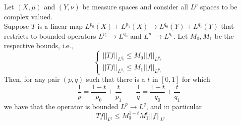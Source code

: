 \begin{theorem}
  \label{thm:riesz_interpolation}
  Let $(X, \mu)$ and $(Y, \nu)$ be measure spaces and consider all $L^p$ spaces to be complex valued.\\
  Suppose $T$ is a linear map $L^{p_0}(X) + L^{p_1}(X) \to L^{q_0}(Y) + L^{q_1}(Y)$ that restricts to
  bounded operators $L^{p_0} \to L^{q_0}$ and $L^{p_1} \to L^{q_1}$. Let $M_0, M_1$ be the respective bounds, i.e.,
  \[ \begin{cases} ||Tf||_{L^{q_0}} \leq M_0 ||f||_{L^{p_0}} \\ ||Tf||_{L^{q_1}} \leq M_1 ||f||_{L^{p_1}}  \end{cases}\]
  Then, for any pair $(p, q)$ such that there is a $t$ in $[0,1]$ for which
  \[\frac{1}{p} = \frac{1-t}{p_0} + \frac{t}{p_1} \qquad \frac{1}{q} = \frac{1-t}{q_0} + \frac{t}{q_1} \]
  we have that the operator is bounded $L^p \to L^q$, and in particular
  \[ ||Tf||_{L^q} \leq M_0^{1-t} M_1^t ||f||_{L^p} \]
\end{theorem}
